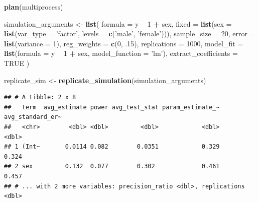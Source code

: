 \documentclass[man]{apa6}
\newenvironment{Shaded}{\begin{snugshade}}{\end{snugshade}}
\newcommand{\DataTypeTok}[1]{\textcolor[rgb]{0.13,0.29,0.53}{#1}}
\newcommand{\DecValTok}[1]{\textcolor[rgb]{0.00,0.00,0.81}{#1}}
\newcommand{\FloatTok}[1]{\textcolor[rgb]{0.00,0.00,0.81}{#1}}
\newcommand{\KeywordTok}[1]{\textcolor[rgb]{0.13,0.29,0.53}{\textbf{#1}}}
\newcommand{\NormalTok}[1]{#1}
\newcommand{\OperatorTok}[1]{\textcolor[rgb]{0.81,0.36,0.00}{\textbf{#1}}}
\newcommand{\OtherTok}[1]{\textcolor[rgb]{0.56,0.35,0.01}{#1}}
\newcommand{\StringTok}[1]{\textcolor[rgb]{0.31,0.60,0.02}{#1}}
\begin{document}
\begin{Shaded}
\begin{Highlighting}[]
\KeywordTok{plan}\NormalTok{(multiprocess)}

\NormalTok{simulation_arguments <-}\StringTok{ }\KeywordTok{list}\NormalTok{(}
  \DataTypeTok{formula =}\NormalTok{ y }\OperatorTok{~}\StringTok{ }\DecValTok{1} \OperatorTok{+}\StringTok{ }\NormalTok{sex,}
  \DataTypeTok{fixed =} \KeywordTok{list}\NormalTok{(}\DataTypeTok{sex =} \KeywordTok{list}\NormalTok{(}\DataTypeTok{var_type =} \StringTok{'factor'}\NormalTok{, }
                            \DataTypeTok{levels =} \KeywordTok{c}\NormalTok{(}\StringTok{'male'}\NormalTok{, }\StringTok{'female'}\NormalTok{))),}
  \DataTypeTok{sample_size =} \DecValTok{20}\NormalTok{,}
  \DataTypeTok{error =} \KeywordTok{list}\NormalTok{(}\DataTypeTok{variance =} \DecValTok{1}\NormalTok{),}
  \DataTypeTok{reg_weights =} \KeywordTok{c}\NormalTok{(}\DecValTok{0}\NormalTok{, }\FloatTok{.15}\NormalTok{),}
  \DataTypeTok{replications =} \DecValTok{1000}\NormalTok{,}
  \DataTypeTok{model_fit =} \KeywordTok{list}\NormalTok{(}\DataTypeTok{formula =}\NormalTok{ y }\OperatorTok{~}\StringTok{ }\DecValTok{1} \OperatorTok{+}\StringTok{ }\NormalTok{sex, }
                   \DataTypeTok{model_function =} \StringTok{'lm'}\NormalTok{),}
  \DataTypeTok{extract_coefficients =} \OtherTok{TRUE}
\NormalTok{)}

\NormalTok{replicate_sim <-}\StringTok{ }\KeywordTok{replicate_simulation}\NormalTok{(simulation_arguments)}
\end{Highlighting}
\end{Shaded}

\begin{Shaded}
\end{Shaded}

\begin{verbatim}
## # A tibble: 2 x 8
##   term  avg_estimate power avg_test_stat param_estimate_~ avg_standard_er~
##   <chr>        <dbl> <dbl>         <dbl>            <dbl>            <dbl>
## 1 (Int~       0.0114 0.082        0.0351            0.329            0.324
## 2 sex         0.132  0.077        0.302             0.461            0.457
## # ... with 2 more variables: precision_ratio <dbl>, replications <dbl>
\end{verbatim}
\end{document}
